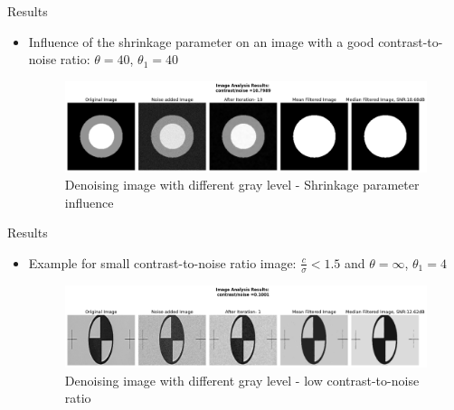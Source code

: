 \documentclass{beamer}
\begin{document}
\begin{frame}{Results}

    \begin{itemize}
\item  Influence of the shrinkage parameter on an image with a good contrast-to-noise ratio: $\theta = 40$, $\theta_1 = 40$
\begin{figure}[h] %

	
	\centering
	\includegraphics[width=1\linewidth]{img/theta_e.png}
	\caption{Denoising image with different gray level - Shrinkage parameter influence}
	\label{fig: Denoising image Theta influence}
\end{figure}
    \end{itemize}
\end{frame}


\begin{frame}{Results}

    \begin{itemize}

\item Example for small contrast-to-noise ratio image:  $\frac{c}{\sigma}<1.5 $ and $\theta = \infty$,  $\theta_1 = 4$

\begin{figure}[h] %
	\centering

	\includegraphics[width=1\linewidth]{img/hardone.png}
	\caption{Denoising image with different gray level - low contrast-to-noise ratio }
	\label{fig: low contrast-to-noise ratio}
\end{figure}

    \end{itemize}
\end{frame}
\end{document}
